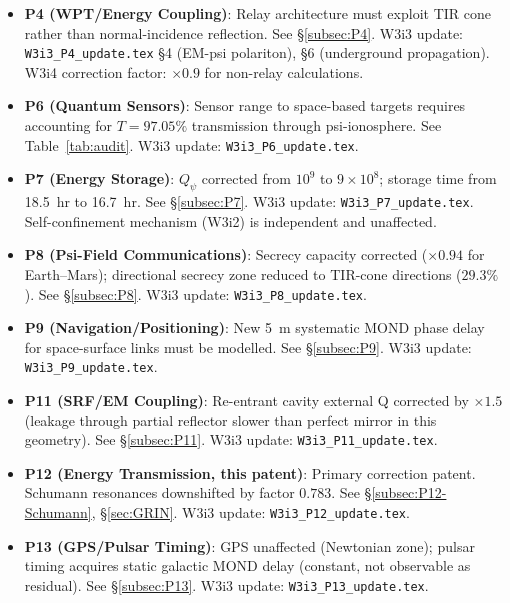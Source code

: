 \documentclass[aps,prd,twocolumn,superscriptaddress]{revtex4-2}
\newcommand{\Qpsi}{Q_\psi}
\newcommand{\ee}[1]{\times 10^{#1}}
\begin{document}
\begin{itemize}
  \item \textbf{P4 (WPT/Energy Coupling)}: Relay architecture must exploit
    TIR cone rather than normal-incidence reflection.  See \S\ref{subsec:P4}.
    W3i3 update: \texttt{W3i3\_P4\_update.tex} \S4 (EM-psi polariton),
    \S6 (underground propagation).  W3i4 correction factor: $\times 0.9$
    for non-relay calculations.

  \item \textbf{P6 (Quantum Sensors)}: Sensor range to space-based
    targets requires accounting for $T = 97.05\%$ transmission through
    psi-ionosphere.  See Table~\ref{tab:audit}.
    W3i3 update: \texttt{W3i3\_P6\_update.tex}.

  \item \textbf{P7 (Energy Storage)}: $\Qpsi$ corrected from $10^9$
    to $9\ee8$; storage time from 18.5~hr to 16.7~hr.
    See \S\ref{subsec:P7}. W3i3 update: \texttt{W3i3\_P7\_update.tex}.
    Self-confinement mechanism (W3i2) is independent and unaffected.

  \item \textbf{P8 (Psi-Field Communications)}: Secrecy capacity
    corrected ($\times 0.94$ for Earth--Mars); directional secrecy
    zone reduced to TIR-cone directions ($29.3\%$).
    See \S\ref{subsec:P8}. W3i3 update: \texttt{W3i3\_P8\_update.tex}.

  \item \textbf{P9 (Navigation/Positioning)}: New 5~m systematic MOND
    phase delay for space-surface links must be modelled.
    See \S\ref{subsec:P9}. W3i3 update: \texttt{W3i3\_P9\_update.tex}.

  \item \textbf{P11 (SRF/EM Coupling)}: Re-entrant cavity external Q
    corrected by $\times 1.5$ (leakage through partial reflector slower
    than perfect mirror in this geometry).
    See \S\ref{subsec:P11}. W3i3 update: \texttt{W3i3\_P11\_update.tex}.

  \item \textbf{P12 (Energy Transmission, this patent)}: Primary
    correction patent. Schumann resonances downshifted by factor $0.783$.
    See \S\ref{subsec:P12-Schumann}, \S\ref{sec:GRIN}.
    W3i3 update: \texttt{W3i3\_P12\_update.tex}.

  \item \textbf{P13 (GPS/Pulsar Timing)}: GPS unaffected (Newtonian zone);
    pulsar timing acquires static galactic MOND delay (constant, not
    observable as residual). See \S\ref{subsec:P13}.
    W3i3 update: \texttt{W3i3\_P13\_update.tex}.


\end{itemize}
\end{document}
